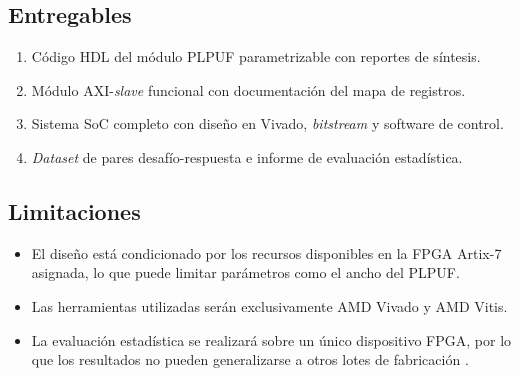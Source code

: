 \subsection{Entregables}

\begin{enumerate}
\item Código HDL del módulo PLPUF parametrizable con reportes de síntesis.
\item Módulo AXI-\textit{slave} funcional con documentación del mapa de registros.
\item Sistema SoC completo con diseño en Vivado, \textit{bitstream} y software de control.
\item \textit{Dataset} de pares desafío-respuesta e informe de evaluación estadística.
\end{enumerate}

\subsection{Limitaciones}

\begin{itemize}
\item El diseño está condicionado por los recursos disponibles en la FPGA Artix-7
asignada, lo que puede limitar parámetros como el ancho del PLPUF.

\item Las herramientas utilizadas serán exclusivamente AMD Vivado y AMD Vitis.

\item La evaluación estadística se realizará sobre un único dispositivo FPGA, por lo
que los resultados no pueden generalizarse a otros lotes de fabricación
\cite{wilde_2020_confidence}.
\end{itemize}



